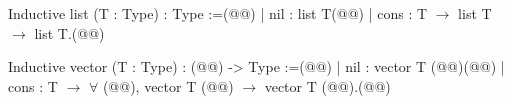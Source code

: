 Inductive list (T : Type) : Type :=(@\vspace{-0.04cm}@)
| nil : list T(@\vspace{-0.04cm}@)
| cons : T $\rightarrow$ list T $\rightarrow$ list T.(@\vspace{-0.04cm}@)

Inductive vector (T : Type) : (@@) -> Type :=(@\vspace{-0.04cm}@)
| nil : vector T (@@)(@\vspace{-0.04cm}@)
| cons : T $\rightarrow$ $\forall$ (@@), vector T (@@) $\rightarrow$ vector T (@@).(@\vspace{-0.04cm}@)
